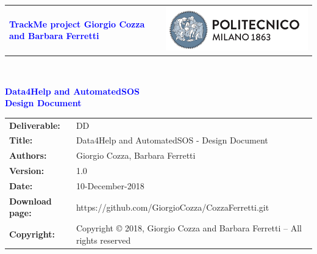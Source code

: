 





\begin{titlepage}



{\begin{table}[t!]
\centering
\begin{tabu} to \textwidth { X[1.3,r,p] X[1.7,l,p] }
\textcolor{Blue}
{\textbf{\small{TrackMe project Giorgio Cozza and Barbara Ferretti}}} & \includegraphics[scale=0.5]{Images/PolimiLogo}
\end{tabu}
\end{table}}~\\ [7cm]


\begin{center}

{\textcolor{Blue}{\textbf{\Huge{Data4Help and AutomatedSOS}}}} \\ [0,5cm]
{\textcolor{Blue}{\textbf{\LARGE{Design Document}}}} \\ [1cm]


\end{center}

\end{titlepage}

\begin{table}[h!]
\begin{tabu} to \textwidth { X[0.3,r,p] X[0.7,l,p] }
\hline

\textbf{Deliverable:} & DD\\
\textbf{Title:} & Data4Help and AutomatedSOS - Design Document \\
\textbf{Authors:} & Giorgio Cozza, Barbara Ferretti \\
\textbf{Version:} & 1.0 \\ 
\textbf{Date:} & 10-December-2018 \\
\textbf{Download page:} & https://github.com/GiorgioCozza/CozzaFerretti.git \\
\textbf{Copyright:} & Copyright © 2018, Giorgio Cozza and Barbara Ferretti – All rights reserved \\
\hline
\end{tabu}
\end{table}




